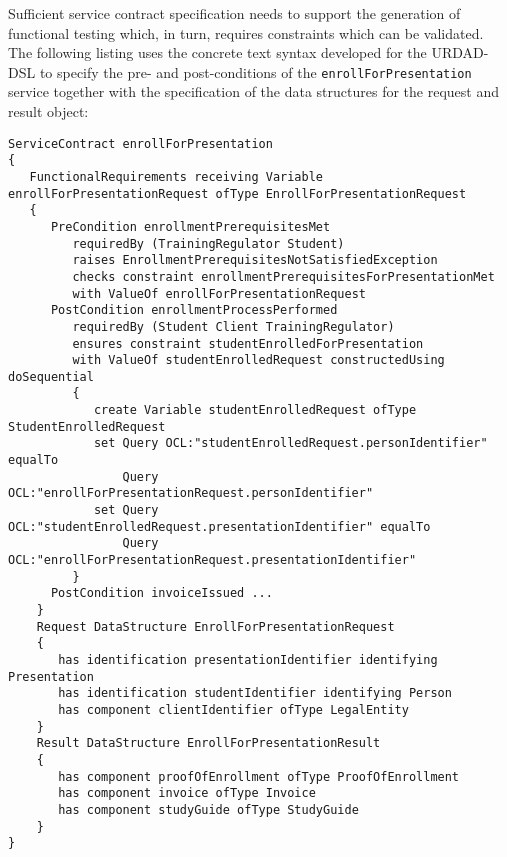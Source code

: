 Sufficient service contract specification needs to support the generation of functional testing which, in turn, requires constraints which can be validated. The following listing uses the concrete text syntax developed for the URDAD-DSL to specify the pre- and post-conditions of the \verb+enrollForPresentation+ service together with the specification of the data structures for the request and result object:
\tiny{\begin{verbatim}
ServiceContract enrollForPresentation
{
   FunctionalRequirements receiving Variable enrollForPresentationRequest ofType EnrollForPresentationRequest
   {
      PreCondition enrollmentPrerequisitesMet
         requiredBy (TrainingRegulator Student) 
         raises EnrollmentPrerequisitesNotSatisfiedException
         checks constraint enrollmentPrerequisitesForPresentationMet
         with ValueOf enrollForPresentationRequest
      PostCondition enrollmentProcessPerformed
         requiredBy (Student Client TrainingRegulator)
         ensures constraint studentEnrolledForPresentation 
         with ValueOf studentEnrolledRequest constructedUsing doSequential
         {
            create Variable studentEnrolledRequest ofType StudentEnrolledRequest
            set Query OCL:"studentEnrolledRequest.personIdentifier" equalTo
                Query OCL:"enrollForPresentationRequest.personIdentifier"                            
            set Query OCL:"studentEnrolledRequest.presentationIdentifier" equalTo
                Query OCL:"enrollForPresentationRequest.presentationIdentifier"                            
         }  
      PostCondition invoiceIssued ...
    }            
    Request DataStructure EnrollForPresentationRequest 
    {
       has identification presentationIdentifier identifying Presentation
       has identification studentIdentifier identifying Person
       has component clientIdentifier ofType LegalEntity         
    }
    Result DataStructure EnrollForPresentationResult 
    {
       has component proofOfEnrollment ofType ProofOfEnrollment
       has component invoice ofType Invoice
       has component studyGuide ofType StudyGuide
    }
}
\end{verbatim}}
\normalsize

